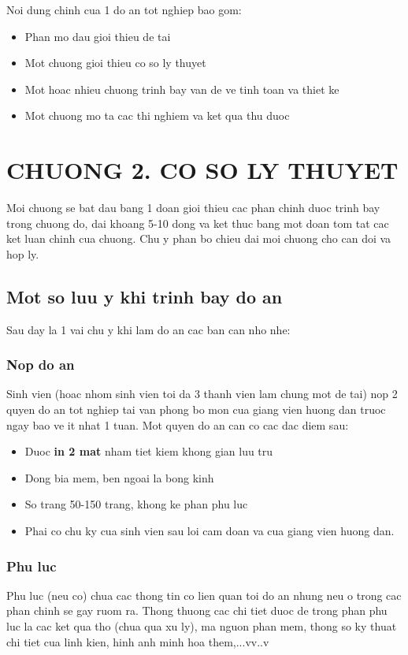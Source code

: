 \documentclass{article}
\begin{document}
Noi dung chinh cua 1 do an tot nghiep bao gom:
\begin{itemize}
    \item Phan mo dau gioi thieu de tai
    \item Mot chuong gioi thieu co so ly thuyet
    \item Mot hoac nhieu chuong trinh bay van de ve tinh toan va thiet ke
    \item Mot chuong mo ta cac thi nghiem va ket qua thu duoc
\end{itemize}
\newpage

\section*{CHUONG 2. CO SO LY THUYET}
 {}
\setcounter{section}{2}
\setcounter{subsection}{0}
Moi chuong se bat dau bang 1 doan gioi thieu cac phan chinh duoc trinh bay trong chuong do, dai khoang 5-10 dong va ket thuc bang mot doan tom tat cac ket luan chinh cua chuong. Chu y phan bo chieu dai moi\cite{watanabe2002theoretical} chuong cho can doi va hop ly.
\subsection{Mot so luu y khi trinh bay do an}
Sau day la 1 vai chu y khi lam do an cac ban can nho nhe:
\subsubsection{Nop do an}
Sinh vien (hoac nhom sinh vien toi da 3 thanh vien lam chung mot de tai) nop 2 quyen do an tot nghiep tai van phong bo mon cua giang vien huong dan truoc ngay bao ve it nhat 1 tuan. Mot quyen do an can co cac dac diem sau:
\begin{itemize}
    \item Duoc \textbf{in 2 mat} nham tiet kiem khong gian luu tru
    \item Dong bia mem, ben ngoai la bong kinh
    \item So trang 50-150 trang, khong ke phan phu luc
    \item Phai co chu ky cua sinh vien sau loi cam doan va cua giang vien huong dan.
\end{itemize}
\subsubsection{Phu luc}
Phu luc (neu co) chua cac thong tin co lien quan toi do an nhung neu o trong cac phan chinh se gay ruom ra. Thong thuong cac chi tiet duoc de trong phan phu luc la cac ket qua tho (chua qua xu ly), ma nguon phan mem, thong so ky thuat chi tiet cua linh kien, hinh anh minh hoa them,...vv..v
\end{document}
